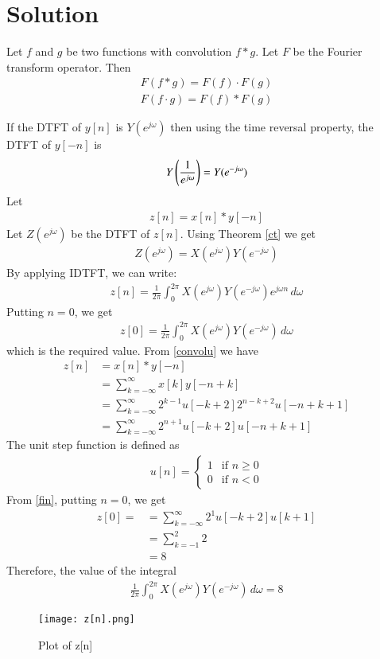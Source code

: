 \documentclass[journal,12pt,twocolumn]{IEEEtran}
\begin{document}
\section{Solution}
\begin{theorem} \label{ct}
Let $f$ and $g$ be two functions with convolution $f*g$. Let $F$ be the Fourier transform operator. Then
\begin{align}
F(f * g)=F(f) \cdot F(g)\\
F(f \cdot g)=F(f) * F(g)
\end{align}
\end{theorem}
If the DTFT of $y[n]$ is $Y(e^{j\omega})$  then using the time reversal property, the DTFT of $y[-n]$ is 
\begin{align}
Y\left(\frac{1}{e^{j\omega}}\right)=Y(e^{-j\omega})  
\end{align}
Let 
\begin{align} \label{convolu}
    z[n]=x[n]*y[-n]
\end{align}
Let $Z(e^{j\omega})$ be the DTFT of $z[n]$. Using Theorem \ref{ct} we get
\begin{align}
  Z(e^{j\omega})= X(e^{j\omega}) Y(e^{-j\omega}) 
\end{align}
By applying IDTFT, we can write:
\begin{align}
z[n]=\frac{1}{2\pi} \int_{0}^{2\pi} X(e^{j\omega}) Y(e^{-j\omega}) e^{j\omega n}\, d\omega  
\end{align}
Putting $n=0$, we get
\begin{align}
z[0]=\frac{1}{2\pi} \int_{0}^{2\pi} X(e^{j\omega}) Y(e^{-j\omega})\, d\omega 
\end{align}
which is the required value. From \eqref{convolu} we have
\begin{align}
    z[n]&=x[n]*y[-n]\\
    &=\sum_{k=-\infty}^{\infty} x[k] y[-n+k]\\
    &=\sum_{k=-\infty}^{\infty}  2^{k-1} u[-k+2] 2^{n-k+2} u[-n+k+1]\\
    &=\sum_{k=-\infty}^{\infty}  2^{n+1} u[-k+2] u[-n+k+1] \label{fin}
\end{align}
The unit step function is defined as
\begin{align}
u[n] =
\left\{
	\begin{array}{ll}
		1  & \mbox{if } n \geq 0 \\
		0 & \mbox{if } n< 0
	\end{array}
\right.
\end{align}
From \eqref{fin}, putting $n=0$, we get
\begin{align}
    z[0]=&=\sum_{k=-\infty}^{\infty}  2^1 u[-k+2] u[k+1]\\
    &=\sum_{k=-1}^{2}2\\
    &=8
\end{align}
Therefore, the value of the integral
\begin{align}
    \frac{1}{2\pi} \int_{0}^{2\pi} X(e^{j\omega}) Y(e^{-j\omega}) \, d\omega=8
\end{align}

\begin{figure}[!h]
         \centering
         \texttt{[image: z[n].png]}
         \caption{Plot of z[n]}
         \label{plot}
\end{figure}
\end{document}
